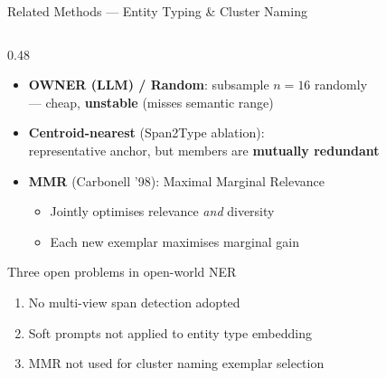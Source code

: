 \documentclass[aspectratio=169,10pt]{beamer}
\newcommand{\hr}[1]{\textcolor{dkred}{\textbf{#1}}}
\begin{document}
\begin{frame}{Related Methods — Entity Typing \& Cluster Naming}
\begin{columns}[T]
\begin{column}{0.48\textwidth}
\begin{itemize}
              — no sampling, but \hr{noisy \& slow on large clusters}
        \item \textbf{OWNER (LLM) / Random}: subsample $n{=}16$ randomly\\
              — cheap, \hr{unstable} (misses semantic range)
        \item \textbf{Centroid-nearest} (Span2Type ablation):\\
              representative anchor, but members are \hr{mutually redundant}
        \item \textbf{MMR} (Carbonell '98): Maximal Marginal Relevance
          \begin{itemize}
            \item Jointly optimises relevance \emph{and} diversity
            \item Each new exemplar maximises marginal gain
          \end{itemize}
      \end{itemize}
      \vspace{0.4em}
      \begin{exampleblock}{Three open problems in open-world NER}
        \begin{enumerate}\setlength{\itemsep}{1pt}
          \item No multi-view span detection adopted
          \item Soft prompts not applied to entity type embedding
          \item MMR not used for cluster naming exemplar selection
        \end{enumerate}
      \end{exampleblock}
    \end{column}
  \end{columns}
\end{frame}
\end{document}
